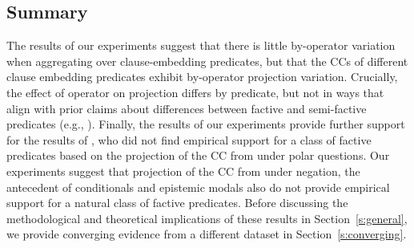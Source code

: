 \documentclass[a4paper,12pt,twoside]{article}
\newcommand{\poscite}[1]{\citeauthor{#1}'s \citeyear{#1}}
\begin{document}

   
	\subsection{Summary}

        The results of our experiments suggest that there is little by-operator variation when aggregating over clause-embedding predicates, but that the CCs of different clause embedding predicates exhibit by-operator projection variation. 
        Crucially, the effect of operator on projection differs by predicate, but not in ways that align with prior claims about differences between factive and semi-factive predicates (e.g., \citealt{karttunen_observations_1971}). Finally, the results of our experiments provide further support for the results of \citealt{degen_are_2022}, who did not find empirical support for a class of factive predicates based on the projection of the CC from under polar questions. Our experiments suggest that projection of the CC from under negation, the antecedent of conditionals and epistemic modals also do not provide empirical support for a natural class of factive predicates. Before discussing the methodological and theoretical implications of these results in Section~\ref{s:general}, we provide converging evidence from a different dataset in Section~\ref{s:converging}.
   
\end{document}
